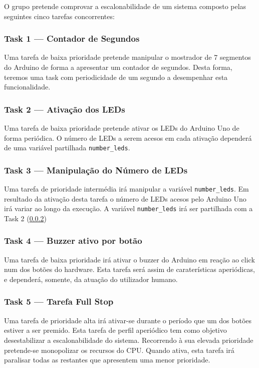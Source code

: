 \documentclass{article}
\begin{document}
O grupo pretende comprovar a escalonabilidade de um sistema composto pelas seguintes cinco tarefas concorrentes:

\subsubsection{Task 1 --- Contador de Segundos}

Uma tarefa de baixa prioridade pretende manipular o mostrador de 7 segmentos do Arduino de forma a apresentar um contador de segundos. Desta forma, teremos uma task com periodicidade de um segundo a desempenhar esta funcionalidade.

\subsubsection{Task 2 --- Ativação dos LEDs}
\label{task_2}
Uma tarefa de baixa prioridade pretende ativar os LEDs do Arduino Uno de forma periódica. O número de LEDs a serem acesos em cada ativação dependerá de uma variável partilhada \texttt{number\_leds}.

\subsubsection{Task 3 --- Manipulação do Número de LEDs}

Uma tarefa de prioridade intermédia irá manipular a variável \texttt{number\_leds}. Em resultado da ativação desta tarefa o número de LEDs acesos pelo Arduino Uno irá variar ao longo da execução. A variável \texttt{number\_leds} irá ser partilhada com a Task 2 (\ref{task_2})

\subsubsection{Task 4 --- Buzzer ativo por botão}

Uma tarefa de baixa prioridade irá ativar o buzzer do Arduino em reação ao click num dos botões do hardware. Esta tarefa será assim de caraterísticas aperiódicas, e dependerá, somente, da atuação do utilizador humano.

\subsubsection{Task 5 --- Tarefa Full Stop}

Uma tarefa de prioridade alta irá ativar-se durante o período que um dos botões estiver a ser premido. Esta tarefa de perfil aperiódico tem como objetivo desestabilizar a escalonabilidade do sistema. Recorrendo à sua elevada prioridade pretende-se monopolizar os recursos do CPU. Quando ativa, esta tarefa irá paralisar todas as restantes que apresentem uma menor prioridade. 
\end{document}
